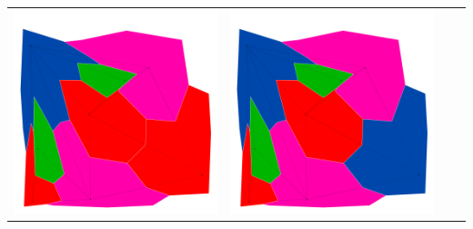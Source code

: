 \documentclass[10pt,a4paper]{article}
\begin{document}
\begin{tabular}{c c c c }
	\includegraphics[scale=.10]{../results/min_conflicts/map_build/minconf_I00009.pdf}&
	\includegraphics[scale=.10]{../results/min_conflicts/map_build/minconf_I00010.pdf}\\


\end{tabular}	
	
\end{document}
